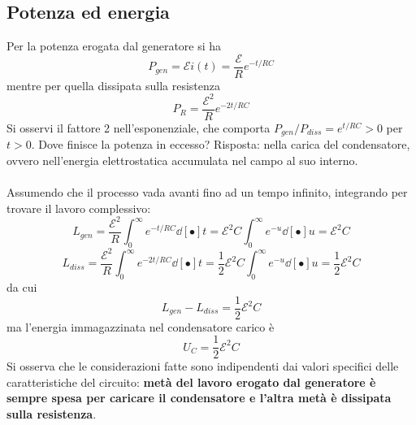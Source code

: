 \subsection{Potenza ed energia}
Per la potenza erogata dal generatore si ha
\[P_{gen} = \mathcal{E} i(t) = \frac{\mathcal{E}}{R} e^{-t/RC} \]
mentre per quella dissipata sulla resistenza
\[P_R = \frac{\mathcal{E}^2}{R} e^{-2t/RC}\]
Si osservi il fattore 2 nell'esponenziale, che comporta $P_{gen} \big/ P_{diss} = e^{t/RC} > 0$ per $t > 0$. Dove finisce la potenza in eccesso? Risposta: nella carica del condensatore, ovvero nell'energia elettrostatica accumulata nel campo al suo interno.
\\~\\
Assumendo che il processo vada avanti fino ad un tempo infinito, integrando per trovare il lavoro complessivo:
\[L_{gen} = \frac{\mathcal{E}^2}{R} \int_0^\infty e^{-t/RC} \dd[•]{t} = \mathcal{E}^2 C \int_0^\infty e^{-u} \dd[•]{u} = \mathcal{E}^2 C\]
\[L_{diss} = \frac{\mathcal{E}^2}{R} \int_0^\infty e^{-2t/RC} \dd[•]{t} = \frac{1}{2} \mathcal{E}^2 C \int_0^\infty e^{-u} \dd[•]{u} = \frac{1}{2} \mathcal{E}^2 C\]
da cui
\[L_{gen} - L_{diss} = \frac{1}{2} \mathcal{E}^2 C\]
ma l'energia immagazzinata nel condensatore carico è 
\[U_C = \frac{1}{2} \mathcal{E}^2 C\]
Si osserva che le considerazioni fatte sono indipendenti dai valori specifici delle caratteristiche del circuito: \textbf{metà del lavoro erogato dal generatore è sempre spesa per caricare il condensatore e l'altra metà è dissipata sulla resistenza}.



